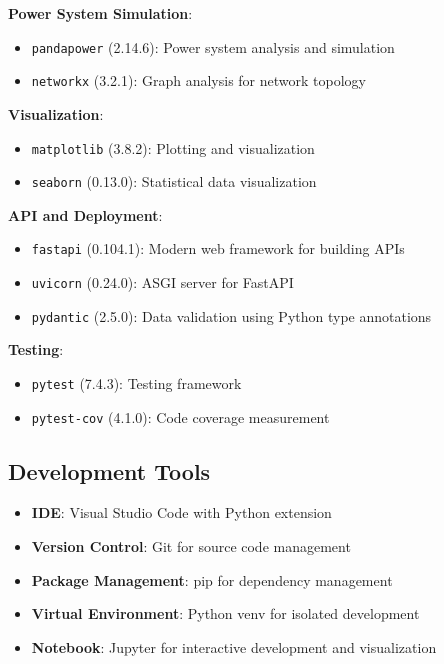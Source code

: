 \documentclass[12pt,a4paper]{report}
\begin{document}
\textbf{Power System Simulation}:
\begin{itemize}
    \item \texttt{pandapower} (2.14.6): Power system analysis and simulation
    \item \texttt{networkx} (3.2.1): Graph analysis for network topology
\end{itemize}

\textbf{Visualization}:
\begin{itemize}
    \item \texttt{matplotlib} (3.8.2): Plotting and visualization
    \item \texttt{seaborn} (0.13.0): Statistical data visualization
\end{itemize}

\textbf{API and Deployment}:
\begin{itemize}
    \item \texttt{fastapi} (0.104.1): Modern web framework for building APIs
    \item \texttt{uvicorn} (0.24.0): ASGI server for FastAPI
    \item \texttt{pydantic} (2.5.0): Data validation using Python type annotations
\end{itemize}

\textbf{Testing}:
\begin{itemize}
    \item \texttt{pytest} (7.4.3): Testing framework
    \item \texttt{pytest-cov} (4.1.0): Code coverage measurement
\end{itemize}

\subsection{Development Tools}

\begin{itemize}
    \item \textbf{IDE}: Visual Studio Code with Python extension
    \item \textbf{Version Control}: Git for source code management
    \item \textbf{Package Management}: pip for dependency management
    \item \textbf{Virtual Environment}: Python venv for isolated development
    \item \textbf{Notebook}: Jupyter for interactive development and visualization
\end{itemize}
\end{document}
